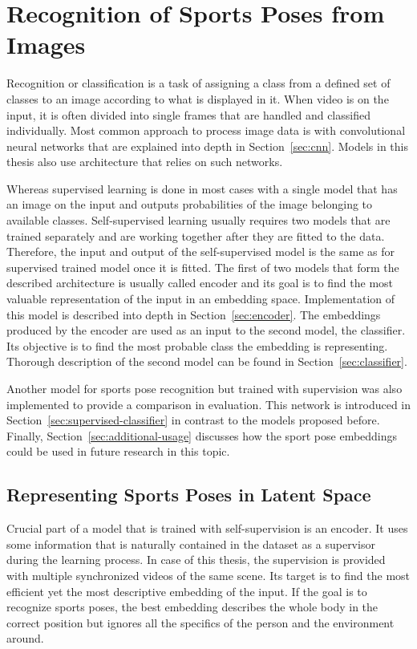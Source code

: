 \chapter{\label{chap:classification}Recognition of Sports Poses from Images}

Recognition or classification is a task of assigning a class from a defined set of classes to an image according to what is displayed in it. When video is on the input, it is often divided into single frames that are handled and classified individually. Most common approach to process image data is with convolutional neural networks that are explained into depth in Section~\ref{sec:cnn}. Models in this thesis also use architecture that relies on such networks.

Whereas supervised learning is done in most cases with a single model that has an image on the input and outputs probabilities of the image belonging to available classes. Self-supervised learning usually requires two models that are trained separately and are working together after they are fitted to the data. Therefore, the input and output of the self-supervised model is the same as for supervised trained model once it is fitted. The first of two models that form the described architecture is usually called encoder and its goal is to find the most valuable representation of the input in an embedding space. Implementation of this model is described into depth in Section~\ref{sec:encoder}. The embeddings produced by the encoder are used as an input to the second model, the classifier. Its objective is to find the most probable class the embedding is representing. Thorough description of the second model can be found in Section~\ref{sec:classifier}.

Another model for sports pose recognition but trained with supervision was also implemented to provide a comparison in evaluation. This network is introduced in Section~\ref{sec:supervised-classifier} in contrast to the models proposed before. Finally, Section~\ref{sec:additional-usage} discusses how the sport pose embeddings could be used in future research in this topic.

\section{\label{sec:encoder}Representing Sports Poses in Latent Space}

Crucial part of a model that is trained with self-supervision is an encoder. It uses some information that is naturally contained in the dataset as a supervisor during the learning process. In case of this thesis, the supervision is provided with multiple synchronized videos of the same scene. Its target is to find the most efficient yet the most descriptive embedding of the input. If the goal is to recognize sports poses, the best embedding describes the whole body in the correct position but ignores all the specifics of the person and the environment around.

